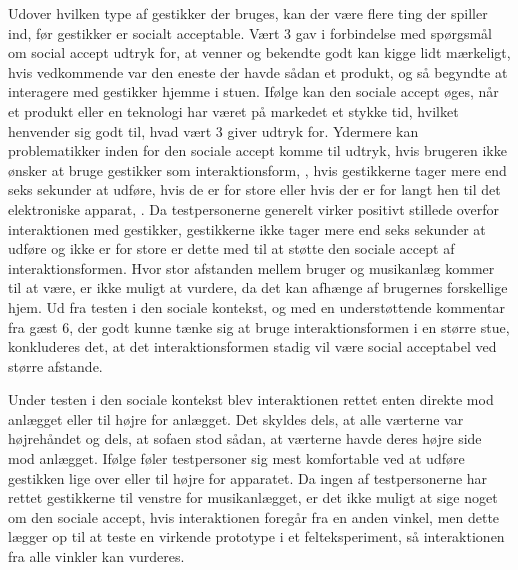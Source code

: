 Udover hvilken type af gestikker der bruges, kan der være flere ting der spiller ind, før gestikker er socialt acceptable. Vært 3 gav i forbindelse med spørgsmål om social accept udtryk for, at venner og bekendte godt kan kigge lidt mærkeligt, hvis vedkommende var den eneste der havde sådan et produkt, og så begyndte at interagere med gestikker hjemme i stuen. Ifølge \textcite[s. 276]{PDF:WouldYouDoThat} kan den sociale accept øges, når et produkt eller en teknologi har været på markedet et stykke tid, hvilket henvender sig godt til, hvad vært 3 giver udtryk for. Ydermere kan problematikker inden for den sociale accept komme til udtryk, hvis brugeren ikke ønsker at bruge gestikker som interaktionsform, \parencite[s. 276]{PDF:WouldYouDoThat}, hvis gestikkerne tager mere end seks sekunder at udføre, hvis de er for store eller hvis der er for langt hen til det elektroniske apparat, \parencite[s. 199]{PDF:AreYouComfortableDoingThat}. Da testpersonerne generelt virker positivt stillede overfor interaktionen med gestikker, gestikkerne ikke tager mere end seks sekunder at udføre og ikke er for store er dette med til at støtte den sociale accept af interaktionsformen. Hvor stor afstanden mellem bruger og musikanlæg kommer til at være, er ikke muligt at vurdere, da det kan afhænge af brugernes forskellige hjem. Ud fra testen i den sociale kontekst, og med en understøttende kommentar fra gæst 6, der godt kunne tænke sig at bruge interaktionsformen i en større stue, konkluderes det, at det interaktionsformen stadig vil være social acceptabel ved større afstande.  

Under testen i den sociale kontekst blev interaktionen rettet enten direkte mod anlægget eller til højre for anlægget. Det skyldes dels, at alle værterne var højrehåndet og dels, at sofaen stod sådan, at værterne havde deres højre side mod anlægget. Ifølge \textcite[s. 197]{PDF:AreYouComfortableDoingThat} føler testpersoner sig mest komfortable ved at udføre gestikken lige over eller til højre for apparatet. Da ingen af testpersonerne har rettet gestikkerne til venstre for musikanlægget, er det ikke muligt at sige noget om den sociale accept, hvis interaktionen foregår fra en anden vinkel, men dette lægger op til at teste en virkende prototype i et felteksperiment, så interaktionen fra alle vinkler kan vurderes. \blankline 
